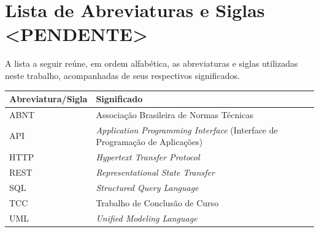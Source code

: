 \documentclass[
    12pt,                %
    openright,           %
    oneside,             %
    a4paper,             %
    english,             %
    brazil               %
]{abntex2}
\begin{document}
\listoftables*
\cleardoublepage

\chapter*{Lista de Abreviaturas e Siglas <PENDENTE>}

\noindent A lista a seguir reúne, em ordem alfabética, as abreviaturas e siglas utilizadas neste trabalho, acompanhadas de seus respectivos significados.

\vspace{\onelineskip}

\begin{center}
\begin{tabular}{@{}p{3.2cm}p{}@{}}
\toprule
\textbf{Abreviatura/Sigla} & \textbf{Significado} \\
\midrule
ABNT  & Associação Brasileira de Normas Técnicas \\
API   & \textit{Application Programming Interface} (Interface de Programação de Aplicações) \\
HTTP  & \textit{Hypertext Transfer Protocol} \\
REST  & \textit{Representational State Transfer} \\
SQL   & \textit{Structured Query Language} \\
TCC   & Trabalho de Conclusão de Curso \\
UML   & \textit{Unified Modeling Language} \\
\bottomrule
\end{tabular}
\end{center}

\cleardoublepage

\tableofcontents*
\cleardoublepage
\end{document}
